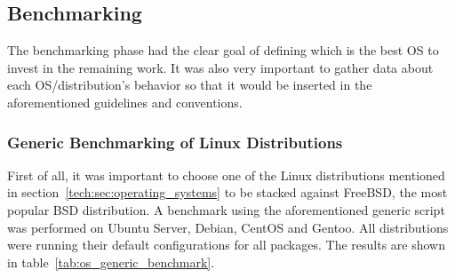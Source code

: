 \subsection{Benchmarking}
The benchmarking phase had the clear goal of defining which is the best OS to invest in the remaining work. It was also very important to gather data about each OS/distribution's behavior so that it would be inserted in the aforementioned guidelines and conventions.

\subsubsection{Generic Benchmarking of Linux Distributions}
First of all, it was important to choose one of the Linux distributions mentioned in section~\ref{tech:sec:operating_systems} to be stacked against FreeBSD, the most popular BSD distribution. A benchmark using the aforementioned generic script was performed on Ubuntu Server, Debian, CentOS and Gentoo. All distributions were running their default configurations for all packages. The results are shown in table~\ref{tab:os_generic_benchmark}.
